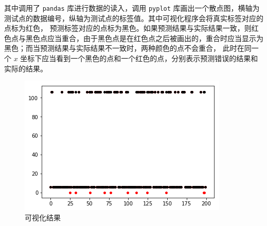 \documentclass[a4paper, 11pt, cn]{elegantpaper}
\begin{document}
其中调用了 \texttt{pandas} 库进行数据的读入，调用 \texttt{pyplot} 库画出一个散点图，横轴为测试点的数据编号，纵轴为测试点的标签值。其中可视化程序会将真实标签对应的点标为红色，
预测标签对应的点标为黑色。如果预测结果与实际结果一致，则红色点与黑色点应当重合，由于黑色点是在红色点之后被画出的，重合时应当显示为黑色；而当预测结果与实际结果不一致时，两种颜色的点不会重合，
此时在同一个 $x$ 坐标下应当看到一个黑色的点和一个红色的点，分别表示预测错误的结果和实际的结果。

\begin{figure}[htbp]
    \centering
    \includegraphics{./output.png}
    \caption{可视化结果}
\end{figure}

\appendix

\nocite{*}
\printbibliography[heading=bibintoc, title=\ebibname]
\end{document}
